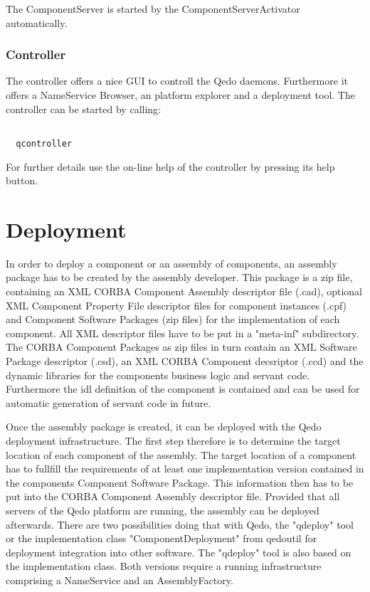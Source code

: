 \documentclass[12pt,a4paper]{report}
\begin{document}
The ComponentServer is started by the ComponentServerActivator automatically.

\subsection{Controller}
\label{sec:Controller}

The controller offers a nice GUI to controll the Qedo daemons. Furthermore it offers a NameService Browser, an platform explorer and a deployment tool. The controller can be started by calling:

\small
\begin{verbatim}

  qcontroller

\end{verbatim}
\normalsize

For further details use the on-line help of the controller by pressing its help button.


\chapter{Deployment}
\label{sec:Deployment}

In order to deploy a component or an assembly of components, an assembly package has to be created by the assembly developer. This package is a zip file, containing an XML CORBA Component Assembly descriptor file (.cad), optional XML Component Property File descriptor files for component instances (.cpf) and Component Software Packages (zip files) for the implementation of each component. All XML descriptor files have to be put in a "meta-inf" subdirectory.
The CORBA Component Packages as zip files in turn contain an XML Software Package descriptor (.csd), an XML CORBA Component decsriptor (.ccd) and the dynamic libraries for the components business logic and servant code. Furthermore the idl definition of the component is contained and can be used for automatic generation of servant code in future.

Once the assembly package is created, it can be deployed with the Qedo deployment infrastructure. The first step therefore is to determine the target location of each component of the assembly. The target location of a component has to fullfill the requirements of at least one implementation version contained in the components Component Software Package. This information then has to be put into the CORBA Component Assembly descriptor file. Provided that all servers of the Qedo platform are running, the assembly can be deployed afterwards. There are two possibilities doing that with Qedo, the "qdeploy" tool or the implementation class "ComponentDeployment" from qedoutil for deployment integration into other software. The "qdeploy" tool is also based on the implementation class. Both versions require a running infrastructure comprising a NameService and an AssemblyFactory.  
\end{document}
